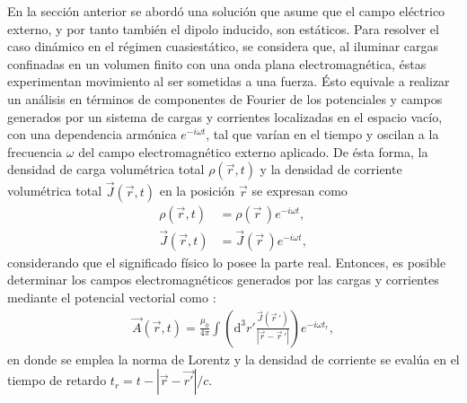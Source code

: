 En la sección anterior se abordó una solución que asume que el campo eléctrico externo, y por tanto también el dipolo inducido, son estáticos. Para resolver el caso dinámico en el régimen cuasiestático, se considera que, al iluminar cargas confinadas en un volumen finito con una onda plana electromagnética, éstas experimentan movimiento al ser sometidas a una fuerza. Ésto equivale a realizar un análisis en términos de componentes de Fourier de los potenciales y campos generados por un sistema de cargas y corrientes localizadas en el espacio vacío, con una dependencia armónica $e^{-i\omega t}$, tal que varían en el tiempo y oscilan a la frecuencia $\omega$ del campo electromagnético externo aplicado. De ésta forma, la densidad de carga volumétrica total $\rho(\Vec{r},t)$ y la densidad de corriente volumétrica total $\Vec{J}(\Vec{r},t)$  en la posición $\Vec{r}$ se expresan como \cite{Jackson}
\begin{align}
    \rho(\Vec{r},t)&=\rho(\Vec{r}\,)e^{-i\omega t},\nonumber\\
    \Vec{J}(\Vec{r},t)&=\Vec{J}(\Vec{r}\,)e^{-i\omega t},
    \label{armonicf}
\end{align}
considerando que el significado físico lo posee la parte real. Entonces, es posible determinar los campos electromagnéticos generados por las cargas y corrientes mediante el potencial vectorial como \cite{Jackson}:
\begin{align}
  \Vec{A}(\Vec{r},t)=\frac{\mu_0}{4\pi}\int \left( \text{d}^3r'\frac{\Vec{J}(\Vec{r}\,')}{|\Vec{r}-\Vec{r}\,'|}\right)e^{-i\omega t_r},
  \label{Achafa}
\end{align}
en donde se emplea la norma de Lorentz \cite{Griffiths} y la densidad de corriente se evalúa en el tiempo de retardo $t_r=t-|\Vec{r}-\Vec{r'}|/c$. \\

